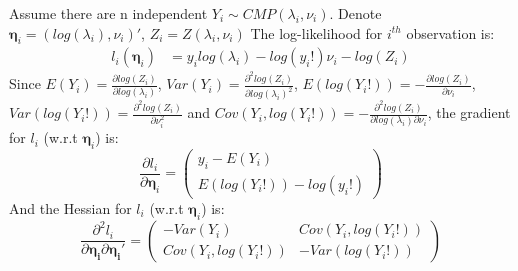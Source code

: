 \documentclass[]{article}
\begin{document}
Assume there are n independent $Y_i \sim CMP(\lambda_i, \nu_i)$. Denote $\boldsymbol{\eta}_i = (log(\lambda_i), \nu_i)'$, $Z_i = Z(\lambda_i, \nu_i)$ The log-likelihood for $i^{th}$ observation is:
\begin{align*}
	l_i(\boldsymbol{\eta}_i) &=  y_i log(\lambda_i) - log(y_i!)\nu_i - log(Z_i)
\end{align*}
Since $E(Y_i) = \frac{\partial log(Z_i)}{\partial log(\lambda_i)}$, $Var(Y_i) = \frac{\partial^2 log(Z_i)}{\partial log(\lambda_i)^2}$, $E(log(Y_i!)) = -\frac{\partial log(Z_i)}{\partial \nu_i}$, $Var(log(Y_i!)) = \frac{\partial^2 log(Z_i)}{\partial \nu_i^2}$ and $Cov(Y_i, log(Y_i!)) = -\frac{\partial^2log(Z_i)}{\partial log(\lambda_i) \partial \nu_i}$, the gradient for $l_i$ (w.r.t $\boldsymbol{\eta}_i$) is:
\begin{equation*}
	\frac{\partial l_i}{\partial \boldsymbol{\eta}_i} = 
	\begin{pmatrix} y_i - E(Y_i)\\
		E(log(Y_i!)) - log(y_i!)
	\end{pmatrix}
\end{equation*}
And the Hessian for $l_i$ (w.r.t $\boldsymbol{\eta}_i$) is:
\begin{equation*}
	\frac{\partial^2 l_i}{\partial \boldsymbol{\eta_i}\partial \boldsymbol{\eta_i}'}= 
	\begin{pmatrix} -Var(Y_i) & Cov(Y_i, log(Y_i!))\\
		Cov(Y_i, log(Y_i!)) & -Var(log(Y_i!))
	\end{pmatrix}
\end{equation*}
\end{document}
